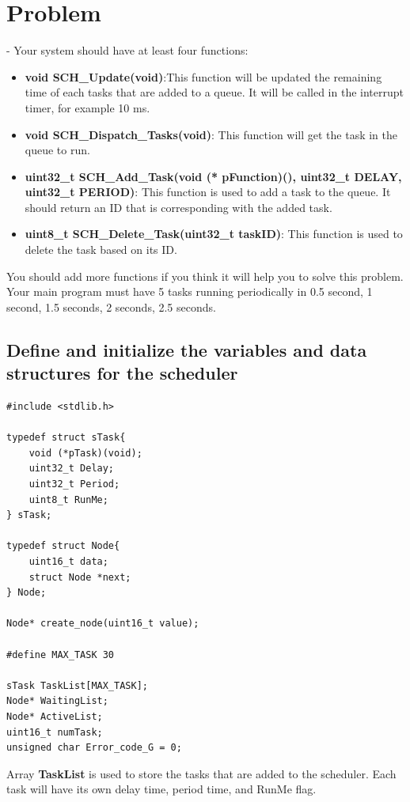 \documentclass[twoside, final]{hcmut_report}
\begin{document}
\section{Problem}
   - Your system should have at least four functions:
   \begin{itemize}
       \item \textbf{void SCH\_Update(void)}:This function will be updated the remaining time of each tasks that are added to a queue. It will be called in the interrupt timer, for example 10 ms.
      \item \textbf{void SCH\_Dispatch\_Tasks(void)}: This function will get the task  in the queue to run. 
      \item \textbf{uint32\_t SCH\_Add\_Task(void (* pFunction)(), uint32\_t DELAY, uint32\_t PERIOD)}: This function is used to add a task to the queue. It should return an ID that is corresponding with the added task. 
       \item \textbf{uint8\_t SCH\_Delete\_Task(uint32\_t taskID)}: This function is used to delete the task based on its ID. 

   \end{itemize}

You should add more functions if you think it will help you to solve this problem. 
Your main program must have 5 tasks running periodically in 0.5 second, 1 second, 1.5 seconds, 2 seconds, 2.5 seconds. 

\subsection{Define and initialize the variables and data structures for the scheduler}

\begin{lstlisting}[basicstyle=\small, caption=An implementation of the Define and initialize]
#include <stdlib.h>

typedef struct sTask{
	void (*pTask)(void);
	uint32_t Delay;
	uint32_t Period;
	uint8_t RunMe;
} sTask;

typedef struct Node{
    uint16_t data;
    struct Node *next;
} Node;

Node* create_node(uint16_t value);

#define MAX_TASK 30

sTask TaskList[MAX_TASK];
Node* WaitingList;
Node* ActiveList;
uint16_t numTask;
unsigned char Error_code_G = 0;
\end{lstlisting}

Array \textbf{TaskList} is used to store the tasks that are added to the scheduler. Each task will have its own delay time, period time, and RunMe flag.
\end{document}
